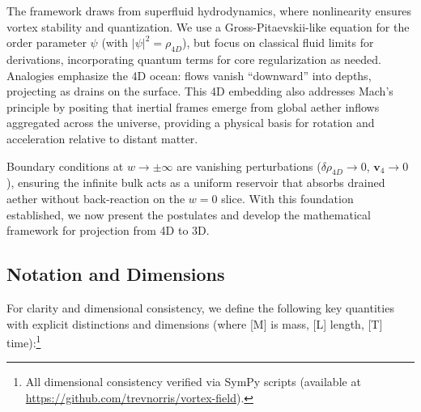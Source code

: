 \documentclass{article}
\begin{document}
The framework draws from superfluid hydrodynamics, where nonlinearity ensures vortex stability and quantization. We use a Gross-Pitaevskii-like equation for the order parameter $\psi$ (with $|\psi|^2 = \rho_{4D}$), but focus on classical fluid limits for derivations, incorporating quantum terms for core regularization as needed. Analogies emphasize the 4D ocean: flows vanish ``downward'' into depths, projecting as drains on the surface. This 4D embedding also addresses Mach's principle by positing that inertial frames emerge from global aether inflows aggregated across the universe, providing a physical basis for rotation and acceleration relative to distant matter.

Boundary conditions at $w \to \pm \infty$ are vanishing perturbations ($\delta \rho_{4D} \to 0$, $\mathbf{v}_4 \to 0$), ensuring the infinite bulk acts as a uniform reservoir that absorbs drained aether without back-reaction on the $w=0$ slice. With this foundation established, we now present the postulates and develop the mathematical framework for projection from 4D to 3D.

\subsection{Notation and Dimensions}

For clarity and dimensional consistency, we define the following key quantities with explicit distinctions and dimensions (where [M] is mass, [L] length, [T] time):\footnote{All dimensional consistency verified via SymPy scripts (available at \url{https://github.com/trevnorris/vortex-field}).}
\end{document}
